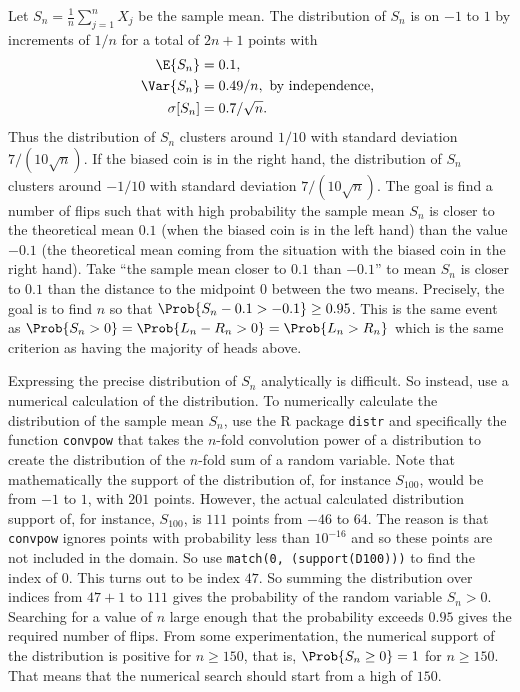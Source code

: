 \documentclass[12pt]{article}
\begin{document}
Let \( S_n = \frac{1}{n} \sum\limits_{j=1}^n X_j \) be the sample mean.
The distribution of \( S_n \) is on \( -1 \) to \( 1 \) by increments of
\( 1/n \) for a total of \( 2n+1 \) points with
\begin{align*}
    \E{S_n} &= 0.1, \\
    \Var{S_n} &= 0.49/n, \text{ by independence, } \\
    \sigma[S_n] &= 0.7/\sqrt{n}.
\end{align*}
Thus the distribution of \( S_n \) clusters around \( 1/10 \) with
standard deviation \( 7/(10 \sqrt{n}) \).%
If the biased coin is in the right hand, the distribution of \( S_n \)
clusters around \( -1/10 \) with standard deviation \( 7/(10 \sqrt{n}) \).%
The goal is find a number of flips such that with high probability the
sample mean \( S_n \) is closer to the theoretical mean \( 0.1 \) (when
the biased coin is in the left hand) than the value \( -0.1 \) (the
theoretical mean coming from the situation with the biased coin in the
right hand).  Take ``the sample mean closer to \( 0.1 \) than \( -0.1 \)''
to mean \( S_n \) is closer to \( 0.1 \) than the distance to the
midpoint \( 0 \) between the two means.  Precisely, the goal is to find \(
n \) so that \( \Prob{S_n - 0.1 > -0.1} \ge 0.95 \).  This is the same
event as \( \Prob{S_n > 0} = \Prob{L_n-R_n > 0} = \Prob{L_n > R_n} \)
which is the same criterion as having the majority of heads above.

Expressing the precise distribution of \( S_n \) analytically is
difficult.  So instead, use a numerical calculation of the distribution.
To numerically calculate the distribution of the sample mean \( S_{n} \),
use the R package \texttt{distr} and specifically the function \texttt{convpow}
that takes the \( n \)-fold convolution power of a distribution to
create the distribution of the \( n \)-fold sum of a random variable.%
Note that mathematically the support of the distribution of, for
instance \( S_{100} \), would be from \( -1 \) to \( 1 \), with \( 201 \)
points.  However, the actual calculated distribution support of, for
instance, \( S_{100} \), is \( 111 \) points from \( -46 \) to \( 64 \).
The reason is that \texttt{convpow} ignores points with probability less
than \( 10^{-16} \) and so these points are not included in the domain.
So use \texttt{match(0, (support(D100)))} to find the index of \( 0 \).
This turns out to be index \( 47 \).  So summing the distribution over
indices from \( 47+1 \) to \( 111 \) gives the probability of the random
variable \( S_{n} > 0 \).  Searching for a value of \( n \) large enough
that the probability exceeds \( 0.95 \) gives the required number of
flips.  From some experimentation, the numerical support of the
distribution is positive for \( n \ge 150 \), that is, \( \Prob{S_{n}
\ge 0} = 1 \) for \( n \ge 150 \).  That means that the numerical search
should start from a high of \( 150 \).
\end{document}
